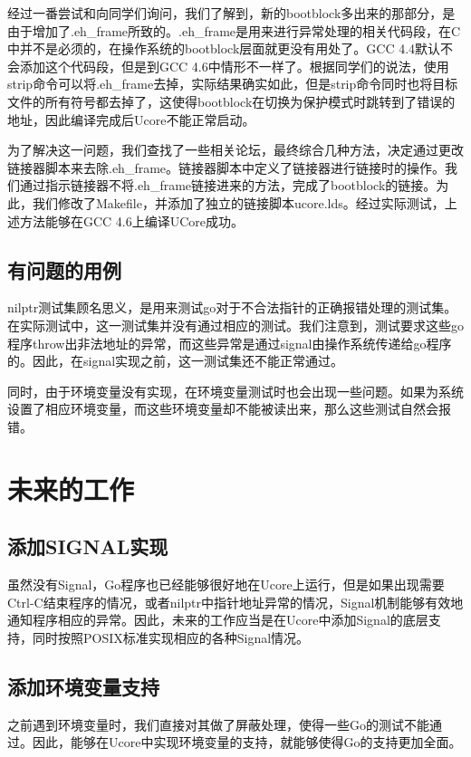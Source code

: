 \documentclass{article}
\begin{document}
经过一番尝试和向同学们询问，我们了解到，新的bootblock多出来的那部分，是由于增加了.eh\_frame所致的。.eh\_frame是用来进行异常处理的相关代码段，在C中并不是必须的，在操作系统的bootblock层面就更没有用处了。GCC 4.4默认不会添加这个代码段，但是到GCC 4.6中情形不一样了。根据同学们的说法，使用strip命令可以将.eh\_frame去掉，实际结果确实如此，但是strip命令同时也将目标文件的所有符号都去掉了，这使得bootblock在切换为保护模式时跳转到了错误的地址，因此编译完成后Ucore不能正常启动。

为了解决这一问题，我们查找了一些相关论坛，最终综合几种方法，决定通过更改链接器脚本来去除.eh\_frame。链接器脚本中定义了链接器进行链接时的操作。我们通过指示链接器不将.eh\_frame链接进来的方法，完成了bootblock的链接。为此，我们修改了Makefile，并添加了独立的链接脚本ucore.lds。经过实际测试，上述方法能够在GCC 4.6上编译UCore成功。

\subsection{有问题的用例}
nilptr测试集顾名思义，是用来测试go对于不合法指针的正确报错处理的测试集。在实际测试中，这一测试集并没有通过相应的测试。我们注意到，测试要求这些go程序throw出非法地址的异常，而这些异常是通过signal由操作系统传递给go程序的。因此，在signal实现之前，这一测试集还不能正常通过。

同时，由于环境变量没有实现，在环境变量测试时也会出现一些问题。如果为系统设置了相应环境变量，而这些环境变量却不能被读出来，那么这些测试自然会报错。

\section{未来的工作}

\subsection{添加SIGNAL实现}
虽然没有Signal，Go程序也已经能够很好地在Ucore上运行，但是如果出现需要Ctrl-C结束程序的情况，或者nilptr中指针地址异常的情况，Signal机制能够有效地通知程序相应的异常。因此，未来的工作应当是在Ucore中添加Signal的底层支持，同时按照POSIX标准实现相应的各种Signal情况。

\subsection{添加环境变量支持}
之前遇到环境变量时，我们直接对其做了屏蔽处理，使得一些Go的测试不能通过。因此，能够在Ucore中实现环境变量的支持，就能够使得Go的支持更加全面。
\end{document}
